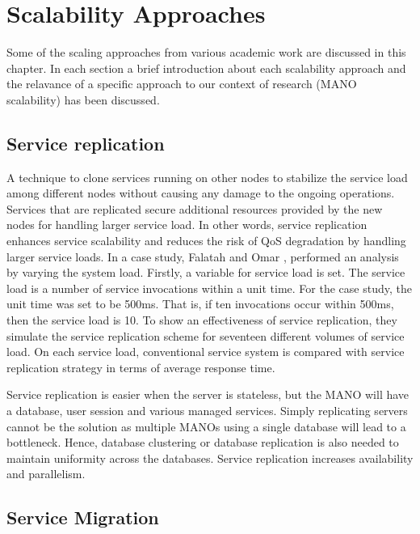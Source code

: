 \chapter{Scalability Approaches}
\label{ch:Scalability Approaches}

Some of the scaling approaches from various academic work are discussed in this chapter. In each section a brief introduction about each  scalability approach and the relavance of a specific approach to our context of research (MANO scalability) has been discussed.

\section{Service replication}

A technique to clone services running on other nodes to stabilize the service load among different nodes without causing any damage to the ongoing operations. Services that are replicated secure additional resources provided by the new nodes for handling larger service load. In other words, service replication enhances service scalability and reduces the risk of QoS degradation by handling larger service loads. In a case study, Falatah and Omar \cite{falatah_cloud_2014}, performed an analysis by varying the system load. Firstly, a variable for service load is set. The service load is a number of service invocations within a unit time. For the case study, the unit time was set to be 500ms. That is, if ten invocations occur within 500ms, then the service load is 10. To show an effectiveness of service replication, they simulate the service replication scheme for seventeen different volumes of service load. On each service load, conventional service system is compared with service replication strategy in terms of average response time.

Service replication is easier when the server is stateless, but the MANO will have a database, user session and various managed services. Simply replicating servers cannot be the solution as multiple MANOs using a single database will lead to a bottleneck. Hence, database clustering or database replication is also needed to maintain uniformity across the databases.  
Service replication increases availability and parallelism.


\section{Service Migration}

